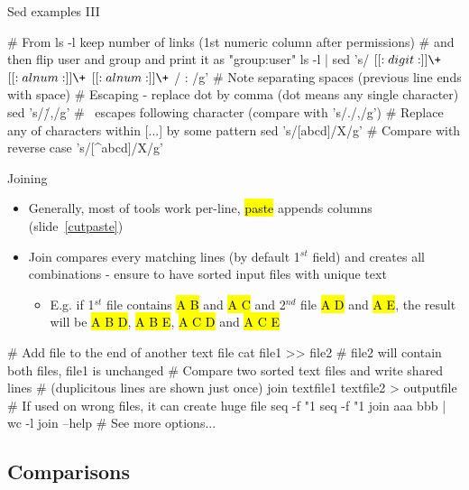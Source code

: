 \documentclass[compress, ucs, xelatex, 11pt, xcolor=svgnames,
  hyperref={
    bookmarks=true,
    unicode=true,
    colorlinks=true,
    pdftitle={Linux, command line and MetaCentrum},
    plainpages=false,
    pdfauthor={Vojtech Zeisek},
    pdfsubject={Course about use of Linux command line, writing shell scripts and using MetaCentrum of CESNET},
    pdfcreator={XeLaTeX},
    pdfkeywords={Linux, GNU, BASH, shell, command line, MetaCentrum},
    linkcolor=DarkRed,
    anchorcolor=DarkBlue,
    citecolor=Indigo,
    filecolor=NavyBlue,
    menucolor=DarkMagenta,
    urlcolor=DarkBlue,
    pdftex},
  url={hyphens, lowtilde} %
  ]{beamer}
\renewcommand{\texttt}[1]{\hl{\ttfamily #1}}
\begin{document}
\begin{frame}[fragile]{Sed examples III}
  \begin{bashcode}
    # From ls -l keep number of links (1st numeric column after permissions)
    # and then flip user and group and print it as "group:user"
    ls -l | sed 's/ \([[:digit:]]\+\) \([[:alnum:]]\+\) \([[:alnum:]]\+\) /
      \1 \3:\2 /g' # Note separating spaces (previous line ends with space)
    # Escaping - replace dot by comma (dot means any single character)
    sed 's/\./,/g' # \ escapes following character (compare with 's/./,/g')
    # Replace any of characters within [...] by some pattern
    sed 's/[abcd]/X/g' # Compare with reverse case 's/[^abcd]/X/g'
  \end{bashcode}
\end{frame}

\begin{frame}[fragile]{Joining} %
  \begin{itemize}
    \item Generally, most of tools work per-line, \texttt{paste} appends columns (slide~\ref{cutpaste})
    \item Join compares every matching lines (by default 1$^{st}$ field) and creates all combinations - ensure to have sorted input files with unique text
    \begin{itemize}
      \item E.g. if 1$^{st}$ file contains \texttt{A B} and \texttt{A C} and 2$^{nd}$ file \texttt{A D} and \texttt{A E}, the result will be \texttt{A B D}, \texttt{A B E}, \texttt{A C D} and \texttt{A C E}
    \end{itemize}
  \end{itemize}
  \begin{bashcode}
    # Add file to the end of another text file
    cat file1 >> file2 # file2 will contain both files, file1 is unchanged
    # Compare two sorted text files and write shared lines
    # (duplicitous lines are shown just once)
    join textfile1 textfile2 > outputfile
    # If used on wrong files, it can create huge file
    seq -f "1 %
    seq -f "1 %
    join aaa bbb | wc -l
    join --help # See more options...
  \end{bashcode}
  \vfill
\end{frame}

\subsection{Comparisons}
\end{document}
